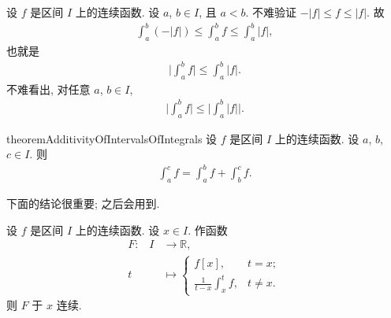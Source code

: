\begin{example}
    设 $f$ 是区间 $I$ 上的连续函数.
    设 $a$, $b \in I$, 且 $a < b$.
    不难验证 $-|f| \leq f \leq |f|$.
    故
    \begin{align*}
        \int_{a}^{b} {(-|f|)} \leq \int_{a}^{b} {f} \leq \int_{a}^{b} {|f|},
    \end{align*}
    也就是
    \begin{align*}
        \Bigg| \int_{a}^{b} {f} \Bigg| \leq \int_{a}^{b} {|f|}.
    \end{align*}
    不难看出, 对任意 $a$, $b \in I$,
    \begin{align*}
        \Bigg| \int_{a}^{b} {f} \Bigg| \leq \Bigg| \int_{a}^{b} {|f|} \Bigg|.
    \end{align*}
\end{example}

\begin{restatable}{theorem}{AdditivityOfIntervalsOfIntegrals}
    设 $f$ 是区间 $I$ 上的连续函数.
    设 $a$, $b$, $c \in I$.
    则
    \begin{align*}
        \int_{a}^{c} {f} = \int_{a}^{b} {f} + \int_{b}^{c} {f}.
    \end{align*}
\end{restatable}

下面的结论很重要; 之后会用到.

\begin{theorem}\label{thm:NewtonLeibnizPrerequisite}%
    设 $f$ 是区间 $I$ 上的连续函数.
    设 $x \in I$.
    作函数
    \begin{align*}
        \text{$F$:} \quad
        I & \to \mathbb{R},                                                       \\
        t & \mapsto \begin{cases}
                        f[x],                                             & t = x;    \\
                        {\displaystyle \frac{1}{t - x} \int_{x}^{t} {f}}, & t \neq x.
                    \end{cases}
    \end{align*}
    则 $F$ 于 $x$ 连续.
\end{theorem}

